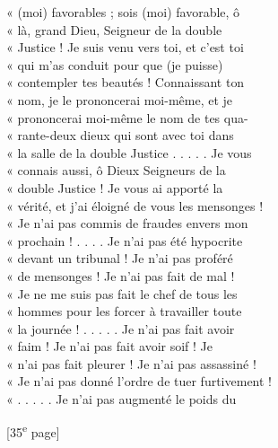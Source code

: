 \documentclass{book}
\begin{document}
{\begin{paracol}{2}
« (moi) favorables ; sois (moi) favorable, ô\\
« là, grand Dieu, Seigneur de la double\\
« Justice ! Je suis venu vers toi, et c’est toi\\
« qui m’as conduit pour que (je puisse)\\
« contempler tes beautés ! Connaissant ton\\
« nom, je le prononcerai moi-même, et je\\
« prononcerai moi-même le nom de tes qua-\\
« rante-deux dieux qui sont avec toi dans\\
« la salle de la double Justice . . . . . Je vous\\
« connais aussi, ô Dieux Seigneurs de la\\
« double Justice ! Je vous ai apporté la\\
« vérité, et j’ai éloigné de vous les mensonges !\\
« Je n’ai pas commis de fraudes envers mon\\
« prochain ! . . . . Je n’ai pas été hypocrite\\
« devant un tribunal ! Je n’ai pas proféré\\
« de mensonges ! Je n’ai pas fait de mal !\\
« Je ne me suis pas fait le chef de tous les\\
« hommes pour les forcer à travailler toute\\
« la journée ! . . . . . Je n’ai pas fait avoir\\
« faim ! Je n’ai pas fait avoir soif ! Je\\
« n’ai pas fait pleurer ! Je n’ai pas assassiné !\\
« Je n’ai pas donné l’ordre de tuer furtivement !\\
« . . . . . Je n’ai pas augmenté le poids du\\
\end{paracol}

{\footnotesize\begin{center} {[35\textsuperscript{e} page]}\end{center}}

}
\end{document}
